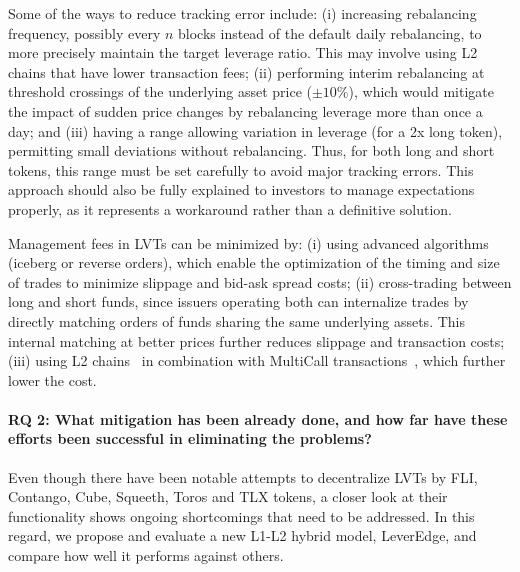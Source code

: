 Some of the ways to reduce tracking error include: (i) increasing rebalancing frequency, possibly every \(n\) blocks instead of the default daily rebalancing, to more precisely maintain the target leverage ratio. This may involve using L2 chains that have lower transaction fees; (ii) performing interim rebalancing at threshold crossings of the underlying asset price (\eg \(\pm10\%\)), which would mitigate the impact of sudden price changes by rebalancing leverage more than once a day; and (iii) having a range allowing variation in leverage (\eg [1.95x, 2.05x] for a 2x long token), permitting small deviations without rebalancing. Thus, for both long and short tokens, this range must be set carefully to avoid major tracking errors. This approach should also be fully explained to investors to manage expectations properly, as it represents a workaround rather than a definitive solution.

Management fees in LVTs can be minimized by: (i) using advanced algorithms (iceberg or reverse orders), which enable the optimization of the timing and size of trades to minimize slippage and bid-ask spread costs; (ii) cross-trading between long and short funds, since issuers operating both can internalize trades by directly matching orders of funds sharing the same underlying assets. This internal matching at better prices further reduces slippage and transaction costs; (iii) using L2 chains~\cite{Gangwal_2022} in combination with MultiCall transactions~\cite{hughes2021multicall}, which further lower the cost.
	
\paragraph{RQ 2: What mitigation has been already done, and how far have these efforts been successful in eliminating the problems?} Even though there have been notable attempts to decentralize LVTs by FLI, Contango, Cube, Squeeth, Toros and TLX tokens, a closer look at their functionality shows ongoing shortcomings that need to be addressed. In this regard, we propose and evaluate a new L1-L2 hybrid model, LeverEdge, and compare how well it performs against others.
	
